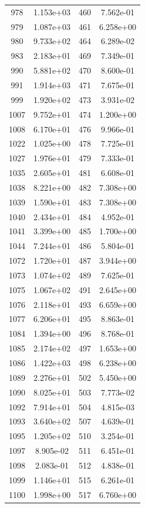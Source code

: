 \documentclass[12pt]{article}
\begin{document}
\begin{longtable}{@{}cccc@{}}
978 & 1.153e+03 & 460 & 7.562e-01 \\
979 & 1.087e+03 & 461 & 6.258e+00 \\
980 & 9.733e+02 & 464 & 6.289e-02 \\
983 & 2.183e+01 & 469 & 7.349e-01 \\
990 & 5.881e+02 & 470 & 8.600e-01 \\
991 & 1.914e+03 & 471 & 7.675e-01 \\
999 & 1.920e+02 & 473 & 3.931e-02 \\
1007 & 9.752e+01 & 474 & 1.200e+00 \\
1008 & 6.170e+01 & 476 & 9.966e-01 \\
1022 & 1.025e+00 & 478 & 7.725e-01 \\
1027 & 1.976e+01 & 479 & 7.333e-01 \\
1035 & 2.605e+01 & 481 & 6.608e-01 \\
1038 & 8.221e+00 & 482 & 7.308e+00 \\
1039 & 1.590e+01 & 483 & 7.308e+00 \\
1040 & 2.434e+01 & 484 & 4.952e-01 \\
1041 & 3.399e+00 & 485 & 1.700e+00 \\
1044 & 7.244e+01 & 486 & 5.804e-01 \\
1072 & 1.720e+01 & 487 & 3.944e+00 \\
1073 & 1.074e+02 & 489 & 7.625e-01 \\
1075 & 1.067e+02 & 491 & 2.645e+00 \\
1076 & 2.118e+01 & 493 & 6.659e+00 \\
1077 & 6.206e+01 & 495 & 8.863e-01 \\
1084 & 1.394e+00 & 496 & 8.768e-01 \\
1085 & 2.174e+02 & 497 & 1.653e+00 \\
1086 & 1.422e+03 & 498 & 6.238e+00 \\
1089 & 2.276e+01 & 502 & 5.450e+00 \\
1090 & 8.025e+01 & 503 & 7.773e-02 \\
1092 & 7.914e+01 & 504 & 4.815e-03 \\
1093 & 3.640e+02 & 507 & 4.639e-01 \\
1095 & 1.205e+02 & 510 & 3.254e-01 \\
1097 & 8.905e-02 & 511 & 6.451e-01 \\
1098 & 2.083e-01 & 512 & 4.838e-01 \\
1099 & 1.146e+01 & 515 & 6.261e-01 \\
1100 & 1.998e+00 & 517 & 6.760e+00 \\

\end{longtable}
\end{document}
